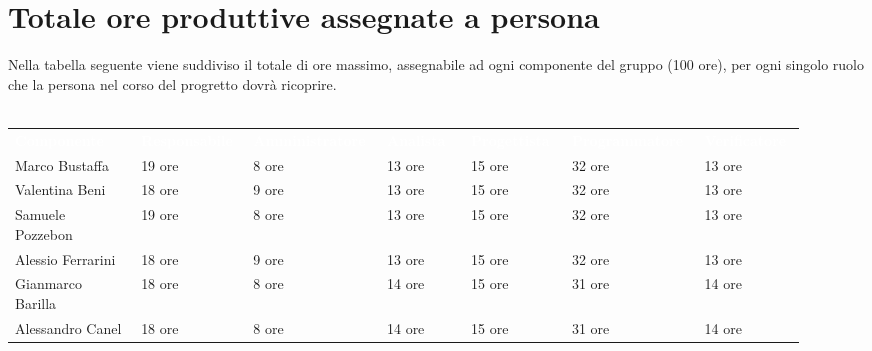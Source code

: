 \section{Totale ore produttive assegnate a persona}
Nella tabella seguente viene suddiviso il totale di ore massimo, assegnabile ad ogni componente del gruppo
(100 ore), per ogni singolo ruolo che la persona nel corso del progretto dovrà ricoprire.\\\\
{\renewcommand{\arraystretch}{1.5}
\scriptsize
\begin{tabular}{p{0.15\linewidth}p{0.13\linewidth}p{0.15\linewidth}p{0.10\linewidth}p{0.12\linewidth}p{0.15\linewidth}p{0.12\linewidth}}
	\rowcolor[RGB]{33, 73, 50}
	\textcolor{white}{\textbf{Componente}} & \textcolor{white}{\textbf{Responsabile}} & \textcolor{white}
	{\textbf{Amministratore}} & \textcolor{white}{\textbf{Analista}} & \textcolor{white}
	{\textbf{Progettista}} & \textcolor{white}{\textbf{Programmatore}} & \textcolor{white}{\textbf{Verificatore}}\\
	\rowcolor[RGB]{216, 235, 171}
	Marco Bustaffa & 19 ore & 8 ore & 13 ore & 15 ore & 32 ore & 13 ore        	\\
	\rowcolor[RGB]{233, 245, 206}
	Valentina Beni & 18 ore & 9 ore & 13 ore & 15 ore & 32 ore & 13 ore        	\\
	\rowcolor[RGB]{216, 235, 171}
	Samuele Pozzebon & 19 ore & 8 ore & 13 ore & 15 ore & 32 ore & 13 ore      	\\
    \rowcolor[RGB]{233, 245, 206}
	Alessio Ferrarini & 18 ore & 9 ore & 13 ore & 15 ore & 32 ore & 13 ore     	\\
    \rowcolor[RGB]{216, 235, 171}
	Gianmarco Barilla & 18 ore & 8 ore & 14 ore & 15 ore & 31 ore & 14 ore     	\\
    \rowcolor[RGB]{233, 245, 206}
	Alessandro Canel & 18 ore & 8 ore & 14 ore & 15 ore & 31 ore & 14 ore    	\\
\end{tabular}	
}